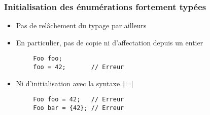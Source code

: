 \documentclass[C++.tex]{subfiles}
\begin{document}
\begin{frame}[fragile]
	\frametitle{Initialisation des énumérations fortement typées}
	\begin{itemize}
		\item Pas de relâchement du typage par ailleurs
		\item En particulier, pas de copie ni d'affectation depuis un entier
	\end{itemize}

	\begin{verbatim}
		Foo foo;
		foo = 42;       // Erreur
	\end{verbatim}

	\begin{itemize}
		\item Ni d'initialisation avec la syntaxe \texttt|=|
	\end{itemize}

	\begin{verbatim}
		Foo foo = 42;   // Erreur
		Foo bar = {42}; // Erreur
	\end{verbatim}



\end{frame}
\end{document}
